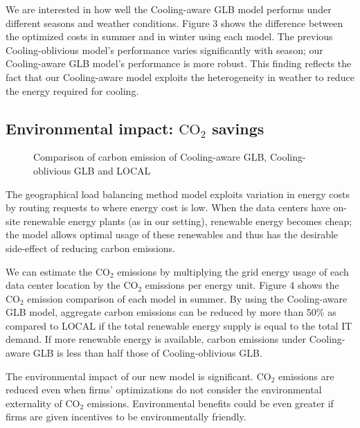 \documentclass{acm_proc_article-sp}
\newcommand{\carbondioxide}{\ensuremath{\mathrm{CO}_2}}
\begin{document}
We are interested in how well the Cooling-aware GLB model performs under different seasons and weather conditions. Figure 3 shows the difference between the optimized costs in summer and in winter using each model. The previous Cooling-oblivious model’s performance varies significantly with season; our Cooling-aware GLB model’s performance is more robust. This finding reflects the fact that our Cooling-aware model exploits the heterogeneity in weather to reduce the energy required for cooling.



\subsection{Environmental impact: \carbondioxide{} savings}


\begin{figure}
\centering
{}
\caption{Comparison of carbon emission of Cooling-aware GLB, Cooling-oblivious GLB and LOCAL}
\end{figure}


The geographical load balancing method model exploits variation in energy costs by routing requests to where energy cost is low. When the data centers have on-site renewable energy plants (as in our setting), renewable energy becomes cheap; the model allows optimal usage of these renewables and thus has the desirable side-effect of reducing carbon emissions.

We can estimate the \carbondioxide{} emissions by multiplying the grid energy usage of each data center location by the \carbondioxide{} emissions per energy unit. Figure 4 shows the \carbondioxide{} emission comparison of each model in summer. By using the Cooling-aware GLB model, aggregate carbon emissions can be reduced by more than 50\% as compared to LOCAL if the total renewable energy supply is equal to the total IT demand. If more renewable energy is available, carbon emissions under Cooling-aware GLB is less than half those of Cooling-oblivious GLB.

The environmental impact of our new model is significant. \carbondioxide{} emissions are reduced even when firms’ optimizations do not consider the environmental externality of \carbondioxide{} emissions. Environmental benefits could be even greater if firms are given incentives to be environmentally friendly.
\end{document}

